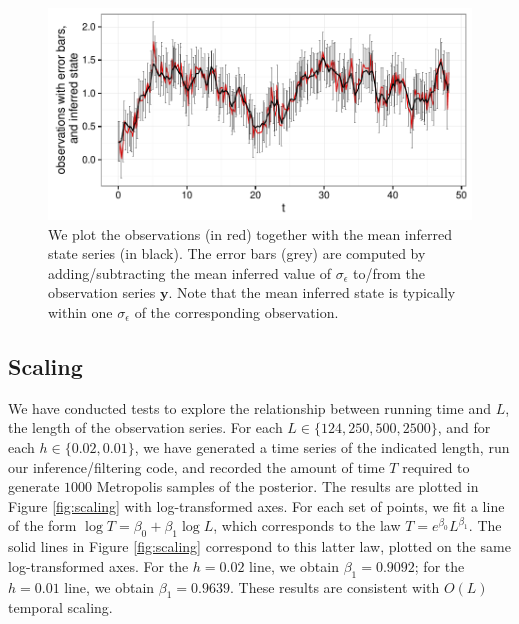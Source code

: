 \documentclass[wcp]{jmlr}
\begin{document}
\begin{figure}[th]
\begin{center}
\includegraphics[width=6in]{timeseries2}
\end{center}
\vspace{-0.375in}
\caption{We plot the observations (in red) together with the mean
  inferred state series (in black).  The
  error bars (grey) are computed by adding/subtracting the mean inferred
  value of $\sigma_\epsilon$ to/from the observation series
  $\mathbf{y}$.  Note that the mean inferred state is typically within
one $\sigma_\epsilon$ of the corresponding observation.}
\label{fig:timeseries2}
\end{figure}

\subsection{Scaling}
\label{sect:scaling}
We have conducted tests to explore the relationship between running
time and $L$, the length
of the observation series.  For each $L \in \{124, 250, 500,
2500\}$, and for each $h \in \{0.02, 0.01\}$, we have generated a
time series of the indicated length, run our inference/filtering code, and
recorded the amount of time $T$ required to generate $1000$ Metropolis
samples of the posterior.  The results are plotted in Figure
\ref{fig:scaling} with log-transformed axes. For each set of points,
we fit a line of the form $\log T = \beta_0 + \beta_1 \log L$, which
corresponds to the law $T = e^{\beta_0} L^{\beta_1}$.  The solid lines
in Figure \ref{fig:scaling} correspond to this latter law, plotted on
the same log-transformed axes.  For the $h=0.02$ line, we obtain
$\beta_1 = 0.9092$; for the $h=0.01$ line, we obtain
$\beta_1=0.9639$.  These results are consistent with $O(L)$ temporal scaling.
\end{document}
